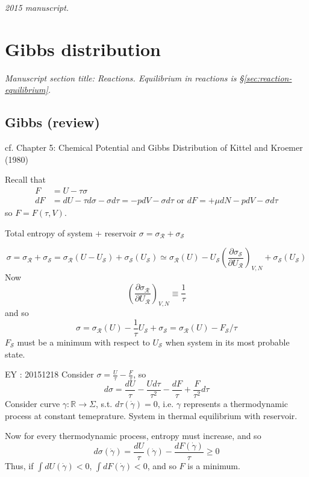 \noindent\textit{2015 manuscript.}

\section{Gibbs distribution}
\noindent\textit{Manuscript section title: Reactions. Equilibrium in reactions is \S\ref{sec:reaction-equilibrium}.}

\subsection{Gibbs (review)}

cf. Chapter 5: Chemical Potential and Gibbs Distribution of Kittel and Kroemer (1980) \cite{CKittelHKroemer1980}

Recall that 
\[
\begin{aligned}
  F & = U - \tau \sigma \\ 
  dF & = dU - \tau d\sigma - \sigma d\tau = -pdV - \sigma d\tau \text{ or } dF = +\mu dN - pdV - \sigma d\tau 
\end{aligned}
\]
so $F = F(\tau,V)$.  

Total entropy of system $+$ reservoir $\sigma = \sigma_{\mathcal{R}} + \sigma_{\mathcal{S}}$ 

\[
\sigma = \sigma_{\mathcal{R}} + \sigma_{\mathcal{S}} = \sigma_{\mathcal{R}}(U- U_{\mathcal{S}}) + \sigma_{\mathcal{S}}(U_{\mathcal{S}}) \simeq \sigma_{\mathcal{R}}(U) - U_{\mathcal{S}} \left( \frac{ \partial \sigma_{\mathcal{S}} }{\partial U_{\mathcal{R}} } \right)_{V,N} + \sigma_{\mathcal{S}}(U_{\mathcal{S}})
\]
Now
\[
\left( \frac{ \partial \sigma_{\mathcal{R}} }{ \partial U_{\mathcal{R}} } \right)_{V,N} \equiv \frac{1}{\tau}
\]
and so 
\[
\sigma = \sigma_{\mathcal{R}}(U) - \frac{1}{\tau} U_{\mathcal{S}} + \sigma_{\mathcal{S}} = \sigma_{\mathcal{R}}(U) - F_{\mathcal{S}} / \tau
\]
$F_{\mathcal{S}}$ must be a minimum with respect to $U_{\mathcal{S}}$ when system in its most probable state.  

EY : 20151218 Consider $\sigma = \frac{U}{\tau} - \frac{F}{\tau}$, so
\[
d\sigma = \frac{dU}{\tau} - \frac{U d\tau }{\tau^2} - \frac{dF}{\tau} + \frac{F}{\tau^2} d\tau
\]
Consider curve $\gamma : \mathbb{R} \to \Sigma$, s.t. $d\tau(\dot{\gamma})=0$, i.e. $\gamma$ represents a thermodynamic process at constant temeprature.  System in thermal equilibrium with reservoir.  

Now for every thermodynamic process, entropy must increase, and so 
\[
d\sigma(\dot{\gamma} ) = \frac{dU}{\tau}(\dot{\gamma} ) - \frac{dF(\dot{\gamma} )}{\tau } \geq 0
\]
Thus, if $\int dU(\dot{\gamma} ) < 0$, $\int dF(\dot{\gamma} ) <0$, and so $F$ is a minimum.  


